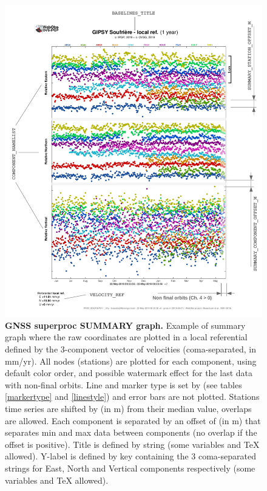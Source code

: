 \begin{figure}
\centering
\includegraphics[width=\textwidth,page=1]{figures/gnss_superproc.pdf}
\caption{\textbf{GNSS superproc SUMMARY graph.} Example of summary graph where the raw coordinates are plotted in a local referential defined by the 3-component vector of velocities  (coma-separated, in mm/yr). All nodes (stations) are plotted for each component, using default color order, and possible watermark effect for the last data with non-final orbits. Line and marker type is set by  (see tables \ref{markertype} and \ref{linestyle}) and error bars are not plotted. Stations time series are shifted by  (in m) from their median value, overlaps are allowed. Each component is separated by an offset of  (in m) that separates min and max data between components (no overlap if the offset is positive). Title is defined by  string (some variables and TeX allowed). Y-label is defined by  key containing the 3 coma-separated strings for East, North and Vertical components respectively (some variables and TeX allowed).}
\label{gnss_summary}
\end{figure}

